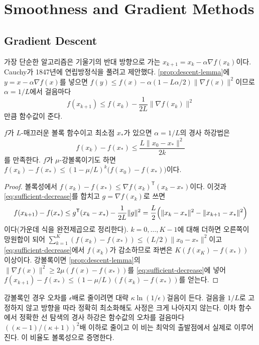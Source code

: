 \section{Smoothness and Gradient Methods}
\label{sec:smooth}

\subsection{Gradient Descent}

가장 단순한 알고리즘은 기울기의 반대 방향으로 가는  $x_{k+1}=x_k-\alpha\nabla f(x_k)$이다. Cauchy가 1847년에 연립방정식을 풀려고 제안했다\cite{cauchy1847,lemarechal2012cauchy}. \cref{prop:descent-lemma}에 $y=x-\alpha\nabla f(x)$를 넣으면 $f(y)\le f(x)-\alpha(1-L\alpha/2)\|\nabla f(x)\|^2$이므로 $\alpha=1/L$에서 걸음마다
\begin{equation}
\label{eq:sufficient-decrease}
f(x_{k+1})\le f(x_k)-\frac1{2L}\|\nabla f(x_k)\|^2
\end{equation}
만큼 함수값이 준다.

\begin{theorem}
\label{thm:gd-rates}
$f$가 $L$-매끄러운 볼록 함수이고 최소점 $x_\ast$가 있으면 $\alpha=1/L$의 경사 하강법은
\[
f(x_k)-f(x_\ast)\le\frac{L\|x_0-x_\ast\|^2}{2k}
\]
를 만족한다. $f$가 $\mu$-강볼록이기도 하면 $f(x_k)-f(x_\ast)\le(1-\mu/L)^k\bigl(f(x_0)-f(x_\ast)\bigr)$이다.
\end{theorem}

\begin{proof}
볼록성에서 $f(x_k)-f(x_\ast)\le\nabla f(x_k)^{\mathsf T}(x_k-x_\ast)$이다. 이것과 \cref{eq:sufficient-decrease}를 합치고 $g=\nabla f(x_k)$로 쓰면
\[
f(x_{k+1})-f(x_\ast)\le g^{\mathsf T}(x_k-x_\ast)-\frac1{2L}\|g\|^2=\frac L2\Bigl(\|x_k-x_\ast\|^2-\|x_{k+1}-x_\ast\|^2\Bigr)
\]
이다(가운데 식을 완전제곱으로 정리한다). $k=0,\dots,K-1$에 대해 더하면 오른쪽이 망원합이 되어 $\sum_{k=1}^K(f(x_k)-f(x_\ast))\le(L/2)\|x_0-x_\ast\|^2$이고 \cref{eq:sufficient-decrease}에서 $f(x_k)$가 감소하므로 좌변은 $K(f(x_K)-f(x_\ast))$ 이상이다. 강볼록이면 \cref{prop:descent-lemma}의 $\|\nabla f(x)\|^2\ge2\mu(f(x)-f(x_\ast))$를 \cref{eq:sufficient-decrease}에 넣어 $f(x_{k+1})-f(x_\ast)\le(1-\mu/L)(f(x_k)-f(x_\ast))$를 얻는다.
\end{proof}

강볼록인 경우 오차를 $\epsilon$배로 줄이려면 대략 $\kappa\ln(1/\epsilon)$걸음이 든다. 걸음을 $1/L$로 고정하지 않고 방향을 따라 정확히 최소화해도 사정은 크게 나아지지 않는다. 이차 함수에서 정확한 선 탐색의 경사 하강은 함수값의 오차를 걸음마다 $((\kappa-1)/(\kappa+1))^2$배 이하로 줄이고 이 비는 최악의 출발점에서 실제로 이루어진다. 이 비율도 볼록성으로 증명한다.

